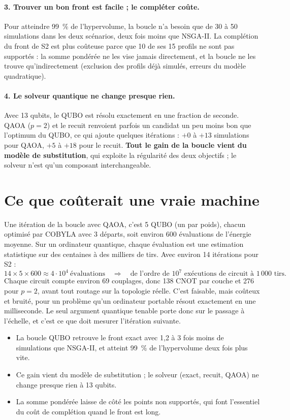\paragraph{3. Trouver un bon front est facile ; le compléter coûte.} Pour atteindre 99~\% de l'hypervolume, la boucle n'a besoin que de 30 à 50 simulations dans les deux scénarios, deux fois moins que NSGA-II. La complétion du front de S2 est plus coûteuse parce que 10 de ses 15 profils ne sont pas supportés : la somme pondérée ne les vise jamais directement, et la boucle ne les trouve qu'indirectement (exclusion des profils déjà simulés, erreurs du modèle quadratique).

\paragraph{4. Le solveur quantique ne change presque rien.} Avec 13 qubits, le QUBO est résolu exactement en une fraction de seconde. QAOA ($p=2$) et le recuit renvoient parfois un candidat un peu moins bon que l'optimum du QUBO, ce qui ajoute quelques itérations : $+0$ à $+13$ simulations pour QAOA, $+5$ à $+18$ pour le recuit. \textbf{Tout le gain de la boucle vient du modèle de substitution}, qui exploite la régularité des deux objectifs ; le solveur n'est qu'un composant interchangeable.

\section{Ce que coûterait une vraie machine}
Une itération de la boucle avec QAOA, c'est 5 QUBO (un par poids), chacun optimisé par COBYLA avec 3 départs, soit environ 600 évaluations de l'énergie moyenne. Sur un ordinateur quantique, chaque évaluation est une estimation statistique sur des centaines à des milliers de tirs. Avec environ 14 itérations pour S2 :
\[
14\times5\times600\approx4\cdot10^4\ \text{évaluations}\quad\Rightarrow\quad\text{de l'ordre de }10^7\text{ exécutions de circuit à }1\,000\text{ tirs.}
\]
Chaque circuit compte environ 69 couplages, donc 138 CNOT par couche et 276 pour $p=2$, avant tout routage sur la topologie réelle. C'est faisable, mais coûteux et bruité, pour un problème qu'un ordinateur portable résout exactement en une milliseconde. Le seul argument quantique tenable porte donc sur le passage à l'échelle, et c'est ce que doit mesurer l'itération suivante.

\begin{resultat}
\begin{itemize}
\item La boucle QUBO retrouve le front exact avec 1,2 à 3 fois moins de simulations que NSGA-II, et atteint 99~\% de l'hypervolume deux fois plus vite.
\item Ce gain vient du modèle de substitution ; le solveur (exact, recuit, QAOA) ne change presque rien à 13 qubits.
\item La somme pondérée laisse de côté les points non supportés, qui font l'essentiel du coût de complétion quand le front est long.
\end{itemize}
\end{resultat}

